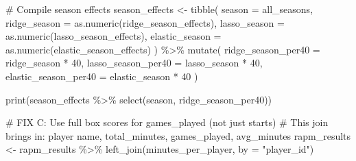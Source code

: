 \documentclass[
  letterpaper,
  DIV=11,
  numbers=noendperiod]{scrartcl}
\newenvironment{Shaded}{\begin{snugshade}}{\end{snugshade}}
\newcommand{\AttributeTok}[1]{\textcolor[rgb]{0.40,0.45,0.13}{#1}}
\newcommand{\CommentTok}[1]{\textcolor[rgb]{0.37,0.37,0.37}{#1}}
\newcommand{\DecValTok}[1]{\textcolor[rgb]{0.68,0.00,0.00}{#1}}
\newcommand{\FunctionTok}[1]{\textcolor[rgb]{0.28,0.35,0.67}{#1}}
\newcommand{\NormalTok}[1]{\textcolor[rgb]{0.00,0.23,0.31}{#1}}
\newcommand{\OtherTok}[1]{\textcolor[rgb]{0.00,0.23,0.31}{#1}}
\newcommand{\SpecialCharTok}[1]{\textcolor[rgb]{0.37,0.37,0.37}{#1}}
\newcommand{\StringTok}[1]{\textcolor[rgb]{0.13,0.47,0.30}{#1}}
\begin{document}
\begin{Shaded}
\begin{Highlighting}[]
\CommentTok{\# Compile season effects}
\NormalTok{season\_effects }\OtherTok{\textless{}{-}} \FunctionTok{tibble}\NormalTok{(}
  \AttributeTok{season =}\NormalTok{ all\_seasons,}
  \AttributeTok{ridge\_season =} \FunctionTok{as.numeric}\NormalTok{(ridge\_season\_effects),}
  \AttributeTok{lasso\_season =} \FunctionTok{as.numeric}\NormalTok{(lasso\_season\_effects),}
  \AttributeTok{elastic\_season =} \FunctionTok{as.numeric}\NormalTok{(elastic\_season\_effects)}
\NormalTok{) }\SpecialCharTok{\%\textgreater{}\%}
  \FunctionTok{mutate}\NormalTok{(}
    \AttributeTok{ridge\_season\_per40 =}\NormalTok{ ridge\_season }\SpecialCharTok{*} \DecValTok{40}\NormalTok{,}
    \AttributeTok{lasso\_season\_per40 =}\NormalTok{ lasso\_season }\SpecialCharTok{*} \DecValTok{40}\NormalTok{,}
    \AttributeTok{elastic\_season\_per40 =}\NormalTok{ elastic\_season }\SpecialCharTok{*} \DecValTok{40}
\NormalTok{  )}

\FunctionTok{print}\NormalTok{(season\_effects }\SpecialCharTok{\%\textgreater{}\%} \FunctionTok{select}\NormalTok{(season, ridge\_season\_per40))}

\CommentTok{\# FIX C: Use full box scores for games\_played (not just starts)}
\CommentTok{\# This join brings in: player name, total\_minutes, games\_played, avg\_minutes}
\NormalTok{rapm\_results }\OtherTok{\textless{}{-}}\NormalTok{ rapm\_results }\SpecialCharTok{\%\textgreater{}\%}
  \FunctionTok{left\_join}\NormalTok{(minutes\_per\_player, }\AttributeTok{by =} \StringTok{"player\_id"}\NormalTok{)}


\end{Highlighting}
\end{Shaded}
\end{document}
